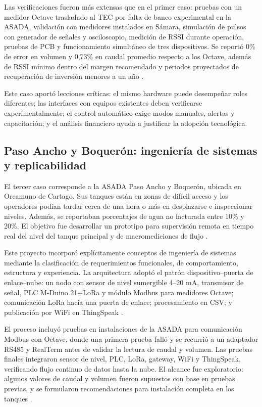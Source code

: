 \documentclass[conference]{IEEEtran}
\begin{document}
Las verificaciones fueron más extensas que en el primer caso: pruebas con un medidor Octave trasladado al TEC por falta de banco experimental en la ASADA, validación con medidores instalados en Sámara, simulación de pulsos con generador de señales y osciloscopio, medición de RSSI durante operación, pruebas de PCB y funcionamiento simultáneo de tres dispositivos. Se reportó 0\% de error en volumen y 0,73\% en caudal promedio respecto a los Octave, además de RSSI mínimo dentro del margen recomendado y periodos proyectados de recuperación de inversión menores a un año \cite{Solorzano2021}.

Este caso aportó lecciones críticas: el mismo hardware puede desempeñar roles diferentes; las interfaces con equipos existentes deben verificarse experimentalmente; el control automático exige modos manuales, alertas y capacitación; y el análisis financiero ayuda a justificar la adopción tecnológica.

\subsection{Paso Ancho y Boquerón: ingeniería de sistemas y replicabilidad}
El tercer caso corresponde a la ASADA Paso Ancho y Boquerón, ubicada en Oreamuno de Cartago. Sus tanques están en zonas de difícil acceso y los operadores podían tardar cerca de una hora o más en desplazarse e inspeccionar niveles. Además, se reportaban porcentajes de agua no facturada entre 10\% y 20\%. El objetivo fue desarrollar un prototipo para supervisión remota en tiempo real del nivel del tanque principal y de macromediciones de flujo \cite{Oviedo2024}.

Este proyecto incorporó explícitamente conceptos de ingeniería de sistemas mediante la clasificación de requerimientos funcionales, de comportamiento, estructura y experiencia. La arquitectura adoptó el patrón dispositivo--puerta de enlace--nube: un nodo con sensor de nivel sumergible 4--20 mA, transmisor de señal, PLC M-Duino 21+LoRa y módulo Modbus para medidores Octave; comunicación LoRa hacia una puerta de enlace; procesamiento en CSV; y publicación por WiFi en ThingSpeak \cite{Oviedo2024}.

El proceso incluyó pruebas en instalaciones de la ASADA para comunicación Modbus con Octave, donde una primera prueba falló y se recurrió a un adaptador RS485 y RealTerm antes de validar la lectura de caudal y volumen. Las pruebas finales integraron sensor de nivel, PLC, LoRa, gateway, WiFi y ThingSpeak, verificando flujo continuo de datos hasta la nube. El alcance fue exploratorio: algunos valores de caudal y volumen fueron supuestos con base en pruebas previas, y se formularon recomendaciones para instalación completa en los tanques \cite{Oviedo2024}.
\end{document}
